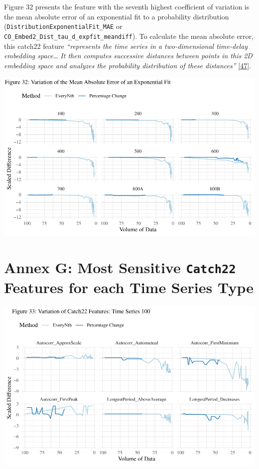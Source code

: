 \documentclass{article}
\begin{document}
Figure 32 presents the feature with the seventh highest coefficient of
variation is the mean absolute error of an exponential fit to a
probability distribution (\texttt{DistributionExponentialFit\_MAE} or
\texttt{CO\_Embed2\_Dist\_tau\_d\_expfit\_meandiff}). To calculate the
mean absolute error, this catch22 feature \emph{``represents the time
series in a two-dimensional time-delay embedding space\ldots{} It then
computes successive distances between points in this 2D embedding space
and analyzes the probability distribution of these distances''}
\protect\hyperlink{ref-feature_book}{{[}47{]}}.

\includegraphics{210431461_CSC8639_Dissertation_files/figure-latex/MAE-1.pdf}

\newpage

\hypertarget{annex-g-most-sensitive-catch22-features-for-each-time-series-type}{%
\section{\texorpdfstring{Annex G: Most Sensitive \texttt{Catch22}
Features for each Time Series
Type}{Annex G: Most Sensitive Catch22 Features for each Time Series Type}}\label{annex-g-most-sensitive-catch22-features-for-each-time-series-type}}

\includegraphics{210431461_CSC8639_Dissertation_files/figure-latex/Catch22Variation100-1.pdf}
\end{document}
